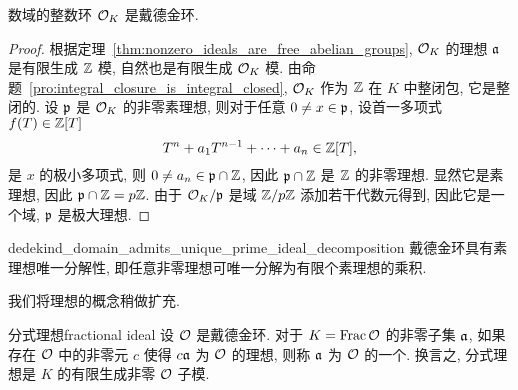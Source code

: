 \begin{theorem}{}{}
数域的整数环 ${\mathcal{O}}_K$ 是戴德金环.
\end{theorem}
\begin{proof}
根据定理~\ref{thm:nonzero_ideals_are_free_abelian_groups}, ${\mathcal{O}}_K$ 的理想 ${\mathfrak{a}}$ 是有限生成 ${\mathbb{Z}}$ 模, 自然也是有限生成 ${\mathcal{O}}_K$ 模. 由命题~\ref{pro:integral_closure_is_integral_closed}, ${\mathcal{O}}_K$ 作为 ${\mathbb{Z}}$ 在 $K$ 中整闭包, 它是整闭的. 设 ${\mathfrak{p}}$ 是 ${\mathcal{O}}_K$ 的非零素理想, 则对于任意 $0\neq x\in{\mathfrak{p}}$, 设首一多项式 $f(T)\in{\mathbb{Z}}[T]$
  \[T^n+a_1T^{n-1}+\dots+a_n\in{\mathbb{Z}}[T],\]
是 $x$ 的极小多项式, 则 $0\neq a_n\in{\mathfrak{p}}\cap {\mathbb{Z}}$, 因此 ${\mathfrak{p}}\cap {\mathbb{Z}}$ 是 ${\mathbb{Z}}$ 的非零理想. 显然它是素理想, 因此 ${\mathfrak{p}}\cap{\mathbb{Z}}=p{\mathbb{Z}}$. 由于 ${\mathcal{O}}_K/{\mathfrak{p}}$ 是域 ${\mathbb{Z}}/p{\mathbb{Z}}$ 添加若干代数元得到, 因此它是一个域, ${\mathfrak{p}}$ 是极大理想.  
\end{proof}

\begin{theorem}{}{dedekind_domain_admits_unique_prime_ideal_decomposition}
戴德金环具有素理想唯一分解性, 即任意非零理想可唯一分解为有限个素理想的乘积.
\end{theorem}

我们将理想的概念稍做扩充.

\begin{definition}{分式理想}{fractional ideal}
设 ${\mathcal{O}}$ 是戴德金环. 对于 $K={\mathrm{Frac}\,} {\mathcal{O}}$ 的非零子集 ${\mathfrak{a}}$, 如果存在 ${\mathcal{O}}$ 中的非零元 $c$ 使得 $c{\mathfrak{a}}$ 为 ${\mathcal{O}}$ 的理想, 则称 ${\mathfrak{a}}$ 为 ${\mathcal{O}}$ 的一个. 换言之, 分式理想是 $K$ 的有限生成非零 ${\mathcal{O}}$ 子模.
\end{definition}

